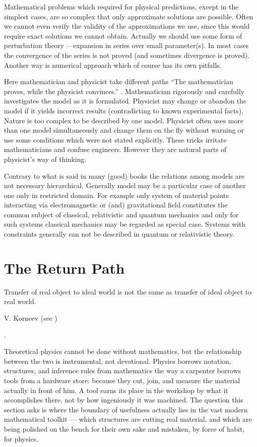 Mathematical problems which required for physical predictions, except in the
simplest cases, are so complex that only approximate solutions are possible.
Often we cannot even verify the validity of the approximations we use, since
this would require exact solutions we cannot obtain. Actually we should use
some form of perturbation theory ---expansion in series over small
parameter(s). In most cases the convergence of the series is not proved (and
sometimes divergence is proved). Another way is numerical approach which of
course has its own pitfalls.

Here mathematician and physicist take different paths “The mathematician
proves, while the physicist convinces.” \cite{Medvedev}. Mathematician
rigorously and carefully investigates the model as it is formulated. Physicist
may change or abandon the model if it yields incorrect results (contradicting
to known experimental facts). Nature is too complex to be described by one
model. Physicist often uses more than one model simultaneously and change them
on the fly without warning or use some conditions which were not stated
explicitly. These tricks irritate mathematicians and confuse engineers. However
they are natural parts of physicist's way of thinking. 

Contrary to what is said in many (good) books the relations among models are
not necessary hierarchical. Generally model may be a particular case of another
one only in restricted domain. For example only system of material points
interacting via electromagnetic or (and) gravitational field constitutes the
common subject of classical, relativistic and quantum mechanics and only for
such systems classical mechanics may be regarded as special case. Systems with
constraints generally can not be described in quantum or relativistic theory.

\section{The Return Path}
\label{rm:rp}
\epigraph{Transfer of real object to ideal world
is not the same as transfer of ideal object to real world.}
{ V. Korneev (see \cite{Strugatsky-Strugatsky})}.


Theoretical physics cannot be done without mathematics, but the relationship
between the two is instrumental, not devotional. Physics borrows notation,
structures, and inference rules from mathematics the way a carpenter borrows
tools from a hardware store: because they cut, join, and measure the material
actually in front of him. A tool earns its place in the workshop by what it
accomplishes there, not by how ingeniously it was machined. The question this
section asks is where the boundary of usefulness actually lies in the vast
modern mathematical toolkit --- which structures are cutting real material, and
which are being polished on the bench for their own sake and mistaken, by force
of habit, for physics.

